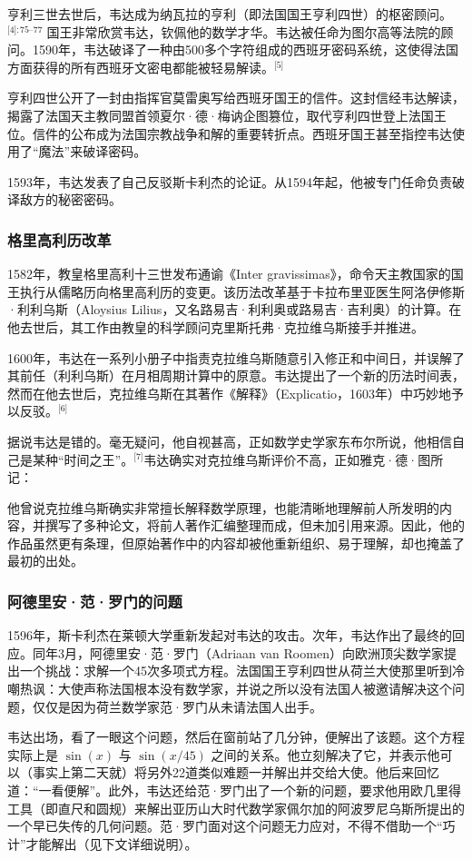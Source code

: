 亨利三世去世后，韦达成为纳瓦拉的亨利（即法国国王亨利四世）的枢密顾问。\(^\text{[4]: 75–77  }\)国王非常欣赏韦达，钦佩他的数学才华。韦达被任命为图尔高等法院的顾问。1590年，韦达破译了一种由500多个字符组成的西班牙密码系统，这使得法国方面获得的所有西班牙文密电都能被轻易解读。\(^\text{[5]}\)

亨利四世公开了一封由指挥官莫雷奥写给西班牙国王的信件。这封信经韦达解读，揭露了法国天主教同盟首领夏尔·德·梅讷企图篡位，取代亨利四世登上法国王位。信件的公布成为法国宗教战争和解的重要转折点。西班牙国王甚至指控韦达使用了“魔法”来破译密码。

1593年，韦达发表了自己反驳斯卡利杰的论证。从1594年起，他被专门任命负责破译敌方的秘密密码。
\subsubsection{格里高利历改革}
1582年，教皇格里高利十三世发布通谕《Inter gravissimas》，命令天主教国家的国王执行从儒略历向格里高利历的变更。该历法改革基于卡拉布里亚医生阿洛伊修斯·利利乌斯（Aloysius Lilius，又名路易吉·利利奥或路易吉·吉利奥）的计算。在他去世后，其工作由教皇的科学顾问克里斯托弗·克拉维乌斯接手并推进。

1600年，韦达在一系列小册子中指责克拉维乌斯随意引入修正和中间日，并误解了其前任（利利乌斯）在月相周期计算中的原意。韦达提出了一个新的历法时间表，然而在他去世后，克拉维乌斯在其著作《解释》（Explicatio，1603年）中巧妙地予以反驳。\(^\text{[6]}\)

据说韦达是错的。毫无疑问，他自视甚高，正如数学史学家东布尔所说，他相信自己是某种“时间之王”。\(^\text{[7]}\)韦达确实对克拉维乌斯评价不高，正如雅克·德·图所记：

他曾说克拉维乌斯确实非常擅长解释数学原理，也能清晰地理解前人所发明的内容，并撰写了多种论文，将前人著作汇编整理而成，但未加引用来源。因此，他的作品虽然更有条理，但原始著作中的内容却被他重新组织、易于理解，却也掩盖了最初的出处。
\subsubsection{阿德里安·范·罗门的问题}
1596年，斯卡利杰在莱顿大学重新发起对韦达的攻击。次年，韦达作出了最终的回应。同年3月，阿德里安·范·罗门（Adriaan van Roomen）向欧洲顶尖数学家提出一个挑战：求解一个45次多项式方程。法国国王亨利四世从荷兰大使那里听到冷嘲热讽：大使声称法国根本没有数学家，并说之所以没有法国人被邀请解决这个问题，仅仅是因为荷兰数学家范·罗门从未请法国人出手。

韦达出场，看了一眼这个问题，然后在窗前站了几分钟，便解出了该题。这个方程实际上是 $\sin(x)$ 与 $\sin(x/45)$ 之间的关系。他立刻解决了它，并表示他可以（事实上第二天就）将另外22道类似难题一并解出并交给大使。他后来回忆道：“一看便解”。此外，韦达还给范·罗门出了一个新的问题，要求他用欧几里得工具（即直尺和圆规）来解出亚历山大时代数学家佩尔加的阿波罗尼乌斯所提出的一个早已失传的几何问题。范·罗门面对这个问题无力应对，不得不借助一个“巧计”才能解出（见下文详细说明）。
